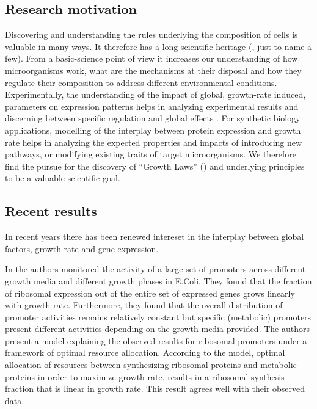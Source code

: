 \documentclass{report}
\begin{document}
\subsection{Research motivation}
Discovering and understanding the rules underlying the composition of cells is valuable in many ways.
It therefore has a long scientific heritage (\cite{Schaechter1958, Maaloe1969, Bremer1987, Klumpp2009a}, just to name a few).
From a basic-science point of view it increases our understanding of how microorganisms work, what are the mechanisms at their disposal and how they regulate their composition to address different environmental conditions.
Experimentally, the understanding of the impact of global, growth-rate induced, parameters on expression patterns helps in analyzing experimental results and discerning between specific regulation and global effects \cite{loven2012}.
For synthetic biology applications, modelling of the interplay between protein expression and growth rate helps in analyzing the expected properties and impacts of introducing new pathways, or modifying existing traits of target microorganisms.
We therefore find the pursue for the discovery of ``Growth Laws'' (\cite{Scott2010a}) and underlying principles to be a valuable scientific goal.
\subsection{Recent results}
In recent years there has been renewed intereset in the interplay between global factors, growth rate and gene expression.

In \cite{Zaslaver2009a} the authors monitored the activity of a large set of promoters across different growth media and different growth phases in E.Coli.
They found that the fraction of ribosomal expression out of the entire set of expressed genes grows linearly with growth rate.
Furthermore, they found that the overall distribution of promoter activities remains relatively constant but specific (metabolic) promoters present different activities depending on the growth media provided.
The authors present a model explaining the observed results for ribosomal promoters under a framework of optimal resource allocation.
According to the model, optimal allocation of resources between synthesizing ribosomal proteins and metabolic proteins in order to maximize growth rate, results in a ribosomal synthesis fraction that is linear in growth rate.
This result agrees well with their observed data.
\end{document}
